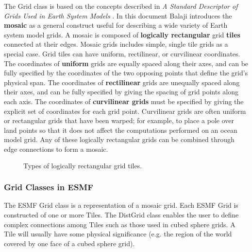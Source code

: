 The Grid class is based on the concepts described in {\it A Standard Descriptor 
of Grids Used in Earth System Models} \cite{BalajiGridSpec}.  In this document
Balaji introduces the {\bf mosaic} as a general construct useful for
describing a wide variety of Earth system
model grids.  A mosaic is composed of {\bf logically rectangular} grid {\bf tiles}
connected at their edges.  Mosaic grids includes simple, single tile grids as
a special case.  Grid tiles can have uniform, rectilinear, or curvilinear
coordinates.  The coordinates of {\bf uniform} grids are equally spaced along their
axes, and can be fully specified by the coordinates of the two opposing points
that define the grid's physical span.  The coordinates of {\bf rectilinear} grids
are unequally spaced along their axes, and can be fully specified by giving
the spacing of grid points along each axis.  The coordinates of {\bf curvilinear 
grids} must be specified by giving the explicit set of coordinates for each
grid point.  Curvilinear grids are often uniform or rectangular grids that 
have been warped; for example, to place a pole over land points so that it
does not affect the computations performed on an ocean model grid.  Any of
these logically rectangular grids can be combined through edge connections
to form a mosaic.

\begin{center}
\begin{figure}
\caption{Types of logically rectangular grid tiles.}
\label{fig:LogRectGrids}
\end{figure}
\end{center}

\subsubsection{Grid Classes in ESMF}

The ESMF Grid class is a representation of a mosaic grid.  Each ESMF
Grid is constructed of one or more Tiles. The DistGrid class enables
the user to define complex connections among Tiles such as those used in
cubed sphere grids.  A Tile will usually have some physical significance
(e.g. the region of the world covered by one face of a cubed sphere grid).  

